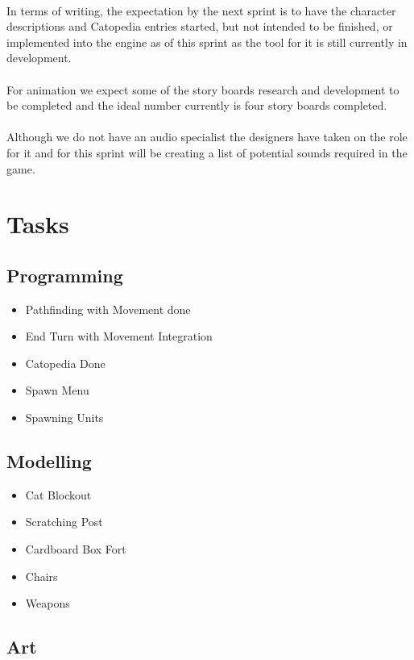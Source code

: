 \documentclass{article}
\begin{document}
\\
In terms of writing, the expectation by the next sprint is to have the character descriptions and Catopedia entries started, but not intended to be finished, or implemented into the engine as of this sprint as the tool for it is still currently in development.
\\
\\
For animation we expect some of the story boards research and development to be completed and the ideal number currently is four story boards completed.
\\
\\
Although we do not have an audio specialist the designers have taken on the role for it and for this sprint will be creating a list of potential sounds required in the game.

\newpage

\section{Tasks}
\subsection{Programming}

\begin{itemize}
\item Pathfinding with Movement done
\item End Turn with Movement Integration
\item Catopedia Done
\item Spawn Menu
\item Spawning Units
\end{itemize}

\subsection{Modelling}

\begin{itemize}
    \item Cat Blockout
    \item Scratching Post
    \item Cardboard Box Fort
    \item Chairs
    \item Weapons
\end{itemize}

\subsection{Art}
\end{document}

